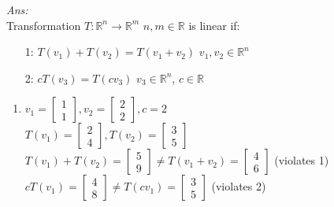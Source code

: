 \documentclass[12pt]{amsart}
\newcommand{\R}{\mathbb{R}}
\newcommand\sol[1]{
\medskip
\begin{mdframed}
\emph{Ans:\\} #1
\end{mdframed}
\medskip
}
\begin{document}
\begin{enumerate}
\sol{
  Transformation $T:\R^n\to\R^m$ $n,m \in \R$ is linear if:\\
  \begin{enumerate}
    \item[1: ]$T(v_1)+T(v_2)=T(v_1+v_2)$ $v_1,v_2\in\R^n$
    \item[2: ]$cT(v_3)=T(cv_3)$ $v_3\in\R^n$, $c\in\R$
  \end{enumerate}
  \begin{enumerate}
    \item $v_1=\left[\begin{matrix} 1 \\ 1\end{matrix}\right],v_2=\left[\begin{matrix} 2 \\ 2\end{matrix}\right],c=2$\\
          $T(v_1)=\left[\begin{matrix} 2 \\ 4 \end{matrix}\right],T(v_2)=\left[\begin{matrix} 3 \\ 5\end{matrix}\right]$\\
          $T(v_1)+T(v_2)=\left[\begin{matrix} 5 \\ 9\end{matrix}\right]\ne T(v_1+v_2)=\left[\begin{matrix} 4 \\ 6\end{matrix}\right]$ (violates 1)\\
          $cT(v_1)=\left[\begin{matrix} 4 \\ 8\end{matrix}\right]\ne T(cv_1)=\left[\begin{matrix} 3 \\ 5\end{matrix}\right]$ (violates 2)


\end{enumerate}}
\end{enumerate}
\end{document}
